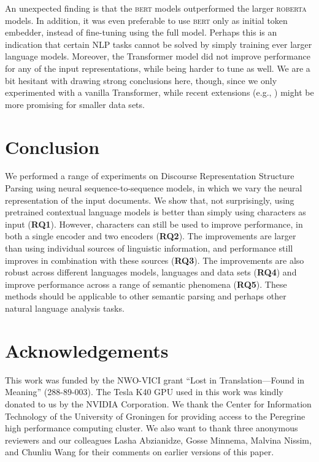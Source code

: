 \documentclass[11pt,a4paper]{article}
\newcommand{\bert}{\textsc{bert}}
\newcommand{\roberta}{\textsc{roberta}}
\begin{document}
An unexpected finding is that the \bert{} models outperformed the larger \roberta{} models. In addition, it was even preferable to use \bert{} only as initial token embedder, instead of fine-tuning using the full model. 
Perhaps this is an indication that certain NLP tasks cannot be solved by simply training ever larger language models.
Moreover, the Transformer model did not improve performance for any of the input representations, while being harder to tune as well. We are a bit hesitant with drawing strong conclusions here, though, since we only experimented with a vanilla Transformer, while recent extensions (e.g., \citealp{universaltransformer:19,guo-etal-2019-star,press-etal-2020-improving}) might be more promising for smaller data sets.

\section{Conclusion}

We performed a range of experiments on Discourse Representation Structure Parsing using neural sequence-to-sequence models, in which we vary the neural representation of the input documents. We show that, not surprisingly, using pretrained contextual language models is better than simply using characters as input (\textbf{RQ1}). However, characters can
still be used to improve performance, in both a single encoder and two encoders (\textbf{RQ2}). The improvements are larger than using individual sources of linguistic information, and performance still improves in combination with these sources (\textbf{RQ3}). The improvements are also robust across different languages models, languages and data sets (\textbf{RQ4}) and improve performance across a range of semantic phenomena (\textbf{RQ5}). These methods should be applicable to other semantic parsing and perhaps other natural language analysis tasks.

\section*{Acknowledgements}

This work was funded by the NWO-VICI grant ``Lost in Translation---Found in Meaning'' (288-89-003). 
The Tesla K40 GPU used in this work was kindly donated to us by the NVIDIA Corporation. 
We thank the Center for Information Technology of the University of Groningen for providing access to the Peregrine high performance computing cluster. 
We also want to thank three anonymous reviewers and our colleagues Lasha Abzianidze, Gosse Minnema, Malvina Nissim, and Chunliu Wang for their comments on earlier versions of this paper.
\end{document}
